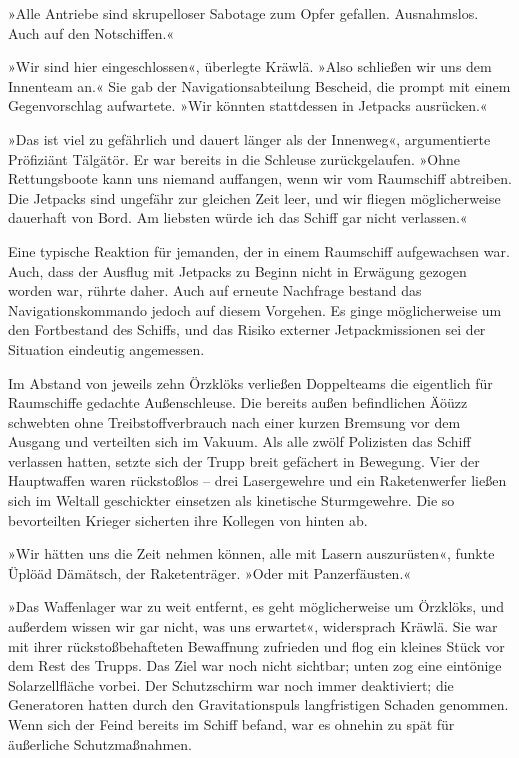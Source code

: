 »Alle Antriebe sind skrupelloser Sabotage zum Opfer gefallen. Ausnahmslos. Auch auf den Notschiffen.«

»Wir sind hier eingeschlossen«, überlegte Kräwlä. »Also schließen wir uns dem Innenteam an.« Sie gab der Navigationsabteilung Bescheid, die prompt mit einem Gegenvorschlag aufwartete. »Wir könnten stattdessen in Jetpacks ausrücken.«

»Das ist viel zu gefährlich und dauert länger als der Innenweg«, argumentierte Pröfiziänt Tälgätör. Er war bereits in die Schleuse zurückgelaufen. »Ohne Rettungsboote kann uns niemand auffangen, wenn wir vom Raumschiff abtreiben. Die Jetpacks sind ungefähr zur gleichen Zeit leer, und wir fliegen möglicherweise dauerhaft von Bord. Am liebsten würde ich das Schiff gar nicht verlassen.«

Eine typische Reaktion für jemanden, der in einem Raumschiff aufgewachsen war. Auch, dass der Ausflug mit Jetpacks zu Beginn nicht in Erwägung gezogen worden war, rührte daher. Auch auf erneute Nachfrage bestand das Navigationskommando jedoch auf diesem Vorgehen. Es ginge möglicherweise um den Fortbestand des Schiffs, und das Risiko externer Jetpackmissionen sei der Situation eindeutig angemessen.

Im Abstand von jeweils zehn Örzklöks verließen Doppelteams die eigentlich für Raumschiffe gedachte Außenschleuse. Die bereits außen befindlichen Äöüzz schwebten ohne Treibstoffverbrauch nach einer kurzen Bremsung vor dem Ausgang und verteilten sich im Vakuum. Als alle zwölf Polizisten das Schiff verlassen hatten, setzte sich der Trupp breit gefächert in Bewegung. Vier der Hauptwaffen waren rückstoßlos – drei Lasergewehre und ein Raketenwerfer ließen sich im Weltall geschickter einsetzen als kinetische Sturmgewehre. Die so bevorteilten Krieger sicherten ihre Kollegen von hinten ab.

»Wir hätten uns die Zeit nehmen können, alle mit Lasern auszurüsten«, funkte Üplöäd Dämätsch, der Raketenträger. »Oder mit Panzerfäusten.«

»Das Waffenlager war zu weit entfernt, es geht möglicherweise um Örzklöks, und außerdem wissen wir gar nicht, was uns erwartet«, widersprach Kräwlä. Sie war mit ihrer rückstoßbehafteten Bewaffnung zufrieden und flog ein kleines Stück vor dem Rest des Trupps. Das Ziel war noch nicht sichtbar; unten zog eine eintönige Solarzellfläche vorbei. Der Schutzschirm war noch immer deaktiviert; die Generatoren hatten durch den Gravitationspuls langfristigen Schaden genommen. Wenn sich der Feind bereits im Schiff befand, war es ohnehin zu spät für äußerliche Schutzmaßnahmen.

